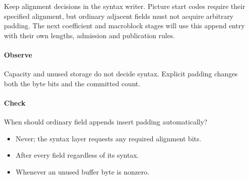 Keep alignment decisions in the syntax writer. Picture start codes require their
specified alignment, but ordinary adjacent fields must not acquire arbitrary
padding. The next coefficient and macroblock stages will use this append entry
with their own lengths, admission and publication rules.

\paragraph{Observe} Capacity and unused storage do not decide syntax. Explicit
padding changes both the byte bits and the committed count.
\paragraph{Check} When should ordinary field appends insert padding automatically?
\begin{itemize}
  \item[A.] Never; the syntax layer requests any required alignment bits.
  \item[B.] After every field regardless of its syntax.
  \item[C.] Whenever an unused buffer byte is nonzero.
\end{itemize}
